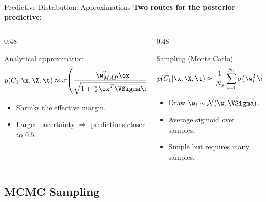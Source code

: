 \begin{frame}{Predictive Distribution: Approximations}
  \textbf{Two routes for the posterior predictive:}
  \vspace{0.3cm}
  \begin{columns}[T]
    \begin{column}{0.48\textwidth}
      \begin{block}{Analytical approximation}
        \[
          p(C_1|\x,\X,\t) \approx \sigma\!\left(\frac{\w_{MAP}^T\ox}{\sqrt{1+\frac{\pi}{8}\ox^T\overline{\VSigma}\ox}}\right)
        \]
        \begin{itemize}
          \item Shrinks the effective margin.
          \item Larger uncertainty $\Rightarrow$ predictions closer to $0.5$.
        \end{itemize}
      \end{block}
    \end{column}
    \begin{column}{0.48\textwidth}
      \begin{block}{Sampling (Monte Carlo)}
        \[
          p(C_1|\x,\X,\t) \approx \frac{1}{N_s}\sum_{i=1}^{N_s}\sigma(\w_i^T\ox)
        \]
        \begin{itemize}
          \item Draw $\w_i \sim \mathcal{N}(\overline{\w},\overline{\VSigma})$.
          \item Average sigmoid over samples.
          \item Simple but requires many samples.
        \end{itemize}
      \end{block}
    \end{column}
  \end{columns}
\end{frame}

\subsection{MCMC Sampling}

